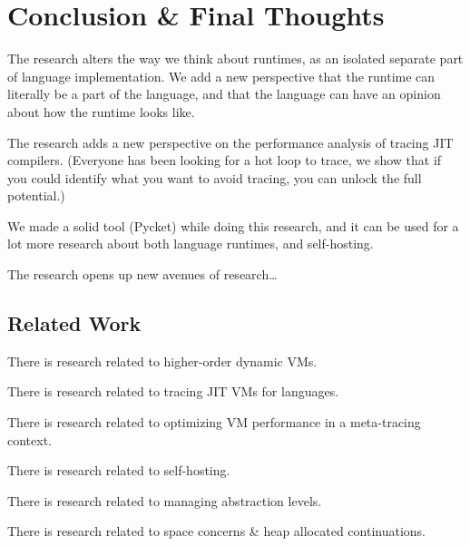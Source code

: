 \chapter{Conclusion \& Final Thoughts}

    \begin{chapterpoint}
        The research alters the way we think about runtimes, as an isolated separate
        part of language implementation. We add a new perspective that the runtime
        can literally be a part of the language, and that the language can have an
        opinion about how the runtime looks like.

        The research adds a new perspective on the performance analysis of tracing JIT compilers.
        (Everyone has been looking for a hot loop to trace, we show that if you could
        identify what you want to avoid tracing, you can unlock the full potential.)

        We made a solid tool (Pycket) while doing this research, 
        and it can be used for a lot more research about both language
        runtimes, and self-hosting.

        The research opens up new avenues of research\dots

    \end{chapterpoint}

    \section{Related Work}

        \begin{mainpoint}
            There is research related to higher-order dynamic VMs.

            There is research related to tracing JIT VMs for languages.

            There is research related to optimizing VM performance in a meta-tracing context.

            There is research related to self-hosting.

            There is research related to managing abstraction levels.

            There is research related to space concerns \& heap allocated continuations.

        \end{mainpoint}

